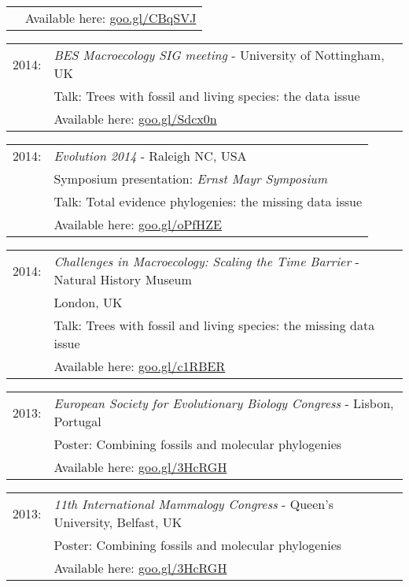 \documentclass[10pt,a4paper]{article}
\begin{document}
{\begin{tabular}{ll}
      & Available here: \href{http://figshare.com/articles/Total_evidence_phylogenies_the_missing_data_issue/1086216}{goo.gl/CBqSVJ}\\
\end{tabular}
\begin{tabular}{ll}
2014: & \textit{BES Macroecology SIG meeting} - University of Nottingham, UK\\
      & Talk: Trees with fossil and living species: the data issue\\ 
      & Available here: \href{http://figshare.com/articles/Trees_with_fossil_and_living_species_the_data_issue/1056307}{goo.gl/Sdcx0n}\\
\end{tabular}
\begin{tabular}{ll}
2014: & \textit{Evolution 2014} - Raleigh NC, USA\\
      & Symposium presentation: \textit{Ernst Mayr Symposium} \\
      & Talk: Total evidence phylogenies: the missing data issue\\
      & Available here: \href{http://figshare.com/articles/Total_evidence_phylogenies_the_missing_data_issue/1086216}{goo.gl/oPfHZE}\\
\end{tabular}
\begin{tabular}{ll}
2014: & \textit{Challenges in Macroecology: Scaling the Time Barrier} - Natural History Museum \\
      & London, UK\\
      & Talk: Trees with fossil and living species: the missing data issue\\
      & Available here: \href{http://figshare.com/articles/Trees_with_fossil_and_living_species_the_data_issue/1056307}{goo.gl/c1RBER}\\
\end{tabular}
\begin{tabular}{ll}
2013: & \textit{European Society for Evolutionary Biology Congress} - Lisbon, Portugal\\
      & Poster: Combining fossils and molecular phylogenies\\
      & Available here: \href{http://figshare.com/articles/Combining_fossils_and_molecular_phylogenies/1056300}{goo.gl/3HcRGH}\\
\end{tabular}
\begin{tabular}{ll}
2013: & \textit{11th International Mammalogy Congress} - Queen's University, Belfast, UK \\
      & Poster: Combining fossils and molecular phylogenies\\
      & Available here: \href{http://figshare.com/articles/Combining_fossils_and_molecular_phylogenies/1056300}{goo.gl/3HcRGH}\\
\end{tabular}
\bigskip

}
\end{document}
